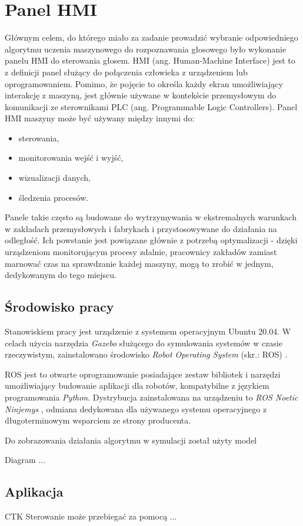 \chapter{Panel HMI}
\label{}

Głównym celem, do którego miało za zadanie prowadzić wybranie odpowiedniego algorytmu uczenia maszynowego do rozpoznawania głosowego było wykonanie panelu HMI do sterowania głosem. HMI (ang. Human-Machine Interface) jest to z definicji panel służący do połączenia człowieka z urządzeniem lub oprogramowaniem. Pomimo, że pojęcie to określa każdy ekran umożliwiający interakcję z maszyną, jest głównie używane w kontekście przemysłowym do komunikacji ze sterownikami PLC (ang. Programmable Logic Controllers). 
Panel HMI maszyny może być używany między innymi do:
\begin{itemize}
    \item sterowania,
    \item monitorowania wejść i wyjść,
    \item wizualizacji danych,
    \item śledzenia procesów.
\end{itemize}
Panele takie często są budowane do wytrzymywania w ekstremalnych warunkach w zakładach przemysłowych i fabrykach i przystosowywane do działania na odległość. Ich powstanie jest powiązane głównie z potrzebą optymalizacji - dzięki urządzeniom monitorującym procesy zdalnie, pracownicy zakładów zamiast marnować czas na sprawdzanie każdej maszyny, mogą to zrobić w jednym, dedykowanym do tego miejscu. 


\section{Środowisko pracy}
\label{}

Stanowiskiem pracy jest urządzenie z systemem operacyjnym Ubuntu 20.04. W celach użycia narzędzia \textit{Gazebo} \cite{gazebo} służącego do symulowania systemów w czasie rzeczywistym, zainstalowano środowisko \textit{Robot Operating System} (skr.: ROS) \cite{ros}. 

ROS \cite{ros} jest to otwarte oprogramowanie posiadające zestaw bibliotek i narzędzi umożliwiający budowanie aplikacji dla robotów, kompatybilne z językiem programowania \textit{Python}. Dystrybucja zainstalowana na urządzeniu to \textit{ROS Noetic Ninjemys} \cite{noetic}, odmiana dedykowana dla używanego systemu operacyjnego z długoterminowym wsparciem ze strony producenta. 

Do zobrazowania działania algorytmu w symulacji został użyty model 

Diagram ...


\section{Aplikacja}
\label{}

CTK
Sterowanie może przebiegać za pomocą ...